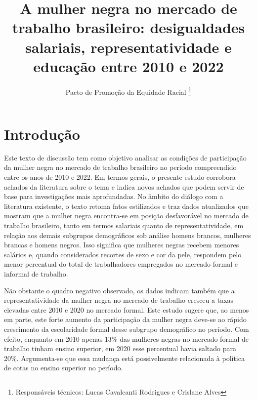 \documentclass[12pt]{article}
\begin{document}
 

\linespread{1.1}

\title{%
  A mulher negra no mercado de trabalho brasileiro: desigualdades salariais, representatividade e educação entre 2010 e 2022\\
  \vspace{1cm}
}

\author{Pacto de Promoção da Equidade Racial \thanks{Responsáveis técnicos: Lucas Cavalcanti Rodrigues e Crislane Alves}}

\maketitle

\clearpage

\thispagestyle{empty}

\thispagestyle{empty}

\section{Introdução}


\par Este texto de discussão tem como objetivo analisar as condições de participação da mulher negra no mercado de trabalho brasileiro no período compreendido entre os anos de 2010 e 2022. Em termos gerais, o presente estudo corrobora achados da literatura sobre o tema e indica novos achados que podem servir de base para investigações mais aprofundadas. No âmbito do diálogo com a literatura existente, o texto retoma fatos estilizados e traz dados atualizados que mostram que a mulher negra encontra-se em posição desfavorável no mercado de trabalho brasileiro, tanto em termos salariais quanto de representatividade, em relação aos demais subgrupos de\-mo\-grá\-fi\-cos sob análise \textemdash homens brancos, mulheres brancas e homens negros. Isso significa que mulheres negras recebem menores salários e, quando considerados recortes de sexo e cor da pele, respondem pelo menor percentual do total de trabalhadores empregados no mercado formal e informal de trabalho. 

\par Não obstante o quadro negativo observado, os dados indicam também que a representatividade da mulher negra no mercado de trabalho cresceu a taxas elevadas entre 2010 e 2020 no mercado formal. Este estudo sugere que, ao menos em parte, este forte aumento da participação da mulher negra deve-se ao rápido crescimento da escolaridade formal desse subgrupo demográfico no período. Com efeito, enquanto em 2010 apenas 13\% das mulheres negras no mercado formal de trabalho tinham ensino superior, em 2020 esse percentual havia saltado para 20\%. Argumenta-se que essa mudança está possivelmente relacionada à política de cotas no ensino superior no período.
\end{document}
